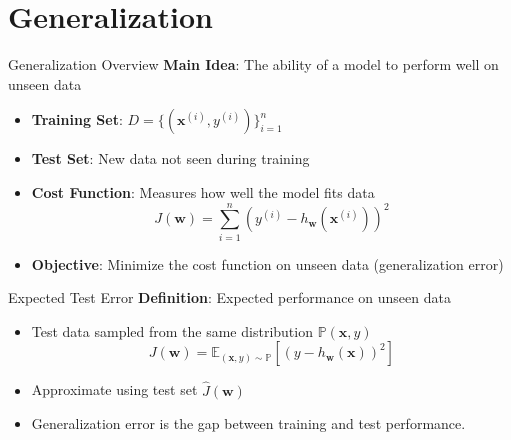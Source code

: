 \documentclass[serif, aspectratio=169]{beamer}
\begin{document}
    


\section{Generalization}

\begin{frame}{Generalization Overview}
    \textbf{Main Idea}: The ability of a model to perform well on unseen data
    \begin{itemize}
        \item \textbf{Training Set}: \( D = \{(\mathbf{x}^{(i)}, y^{(i)})\}_{i=1}^n \)
        \item \textbf{Test Set}: New data not seen during training
        \item \textbf{Cost Function}: Measures how well the model fits data
        \[
        J(\mathbf{w}) = \sum_{i=1}^{n} (y^{(i)} - h_{\mathbf{w}}(\mathbf{x}^{(i)}))^2
        \]
        \item \textbf{Objective}: Minimize the cost function on unseen data (generalization error)
    \end{itemize}
\end{frame}

\begin{frame}{Expected Test Error}
    \textbf{Definition}: Expected performance on unseen data
    \begin{itemize}
        \item Test data sampled from the same distribution \( \mathbb{P}(\mathbf{x}, y) \)
        \[
        J(\mathbf{w}) = \mathbb{E}_{(\mathbf{x}, y) \sim \mathbb{P}}[(y - h_{\mathbf{w}}(\mathbf{x}))^2]
        \]
        \item Approximate using test set \( \hat{J}(\mathbf{w}) \)
        \item Generalization error is the gap between training and test performance.
    \end{itemize}
\end{frame}
\end{document}
